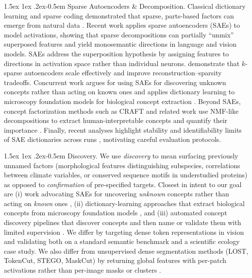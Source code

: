 \documentclass[runningheads]{llncs}
\makeatletter
\renewcommand{\paragraph}{%
  \@startsection{paragraph}{4}%
  {\z@}{1.5ex \@plus 1ex \@minus .2ex}{-0.5em}%
  {\normalfont\normalsize\bfseries}%
}
\makeatother
\begin{document}
\paragraph{Sparse Autoencoders \& Decomposition.}
Classical dictionary learning and sparse coding demonstrated that sparse, parts-based factors can emerge from natural data \citep{olshausen1996nature,aharon2006ksvd,lee1999nmf}.
Recent work applies sparse autoencoders (SAEs) to model activations, showing that sparse decompositions can partially ``unmix'' superposed features and yield monosemantic directions \citep{elhage2022superposition,bricken2023monosemanticity,gao2025scaling} in language and vision models.
SAEs address the superposition hypothesis \citep{elhage2022superposition} by assigning features to directions in activation space rather than individual neurons.
\citep{gao2025scaling} demonstrate that $k$-sparse autoencoders scale effectively and improve reconstruction--sparsity tradeoffs.
Concurrent work argues for using SAEs for discovering unknown concepts rather than acting on known ones \citep{peng2025unknown} and applies dictionary learning to microscopy foundation models for biological concept extraction \citep{donhauser2024towards}.
Beyond SAEs, concept factorization methods such as CRAFT and related work use NMF-like decompositions to extract human-interpretable concepts and quantify their importance \citep{fel2023craft,fel2023holistic}.
Finally, recent analyses highlight stability and identifiability limits of SAE dictionaries across runs \citep{leask2025sparse}, motivating careful evaluation protocols.

\paragraph{Discovery.}
We use \emph{discovery} to mean surfacing previously unnamed factors (morphological features distinguishing subspecies, correlations between climate variables, or conserved sequence motifs in understudied proteins) as opposed to \emph{confirmation} of pre-specified targets.
Closest in intent to our goal are (i) work advocating SAEs for uncovering \emph{unknown} concepts rather than acting on \emph{known} ones \citep{peng2025unknown}, (ii) dictionary-learning approaches that extract biological concepts from microscopy foundation models \citep{donhauser2024towards}, and (iii) automated concept discovery pipelines that discover concepts and then name or validate them with limited supervision \citep{rao2024discover}.
We differ by targeting dense token representations in vision and validating both on a standard semantic benchmark and a scientific ecology case study.
We also differ from unsupervised dense segmentation methods (LOST, TokenCut, STEGO, MaskCut) by returning global features with per-patch activations rather than per-image masks or clusters \citep{simeoni2021lost,wang2023tokencut,hamilton2022stego,wang2023maskcut}.
\end{document}
